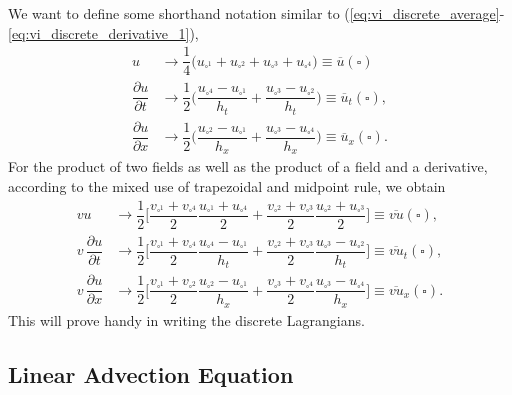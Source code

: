 \documentclass[12pt,a4paper,reqno]{article}
\begin{document}
We want to define some shorthand notation similar to (\ref{eq:vi_discrete_average}-\ref{eq:vi_discrete_derivative_1}),
\begin{align}
\label{eq:applications_definitions_discrete_average}
u &\rightarrow \dfrac{1}{4} \Big( u_{\square^1} + u_{\square^2} + u_{\square^3} + u_{\square^4} \Big) \equiv \overline{u} (\square) \\
\label{eq:applications_definitions_discrete_derivative_t}
\dfrac{\partial u}{\partial t} &\rightarrow \dfrac{1}{2} \bigg( \dfrac{u_{\square^4} - u_{\square^1}}{h_{t}} + \dfrac{u_{\square^3} - u_{\square^2}}{h_{t}} \bigg) \equiv \overline{u}_{t} (\square) , \\
\label{eq:applications_definitions_discrete_derivative_x}
\dfrac{\partial u}{\partial x} &\rightarrow \dfrac{1}{2} \bigg( \dfrac{u_{\square^2} - u_{\square^1}}{h_{x}} + \dfrac{u_{\square^3} - u_{\square^4}}{h_{x}} \bigg) \equiv \overline{u}_{x} (\square) .
\end{align}
For the product of two fields as well as the product of a field and a derivative, according to the mixed use of trapezoidal and midpoint rule, we obtain
\begingroup
\allowdisplaybreaks
\begin{align}
\label{eq:applications_definitions_discrete_average_trapezoidal}
v u &\rightarrow
\dfrac{1}{2} \bigg[
\dfrac{v_{\square^{1}} + v_{\square^{4}}}{2}
\dfrac{u_{\square^{1}} + u_{\square^{4}}}{2} +
\dfrac{v_{\square^{2}} + v_{\square^{3}}}{2}
\dfrac{u_{\square^{2}} + u_{\square^{3}}}{2}
\bigg] \equiv \overline{v u} (\square) ,
\\
\label{eq:applications_definitions_discrete_derivative_trapezoidal_t}
v \, \dfrac{\partial u}{\partial t} &\rightarrow
\dfrac{1}{2} \bigg[
\dfrac{v_{\square^{1}} + v_{\square^{4}}}{2}
\dfrac{u_{\square^{4}} - u_{\square^{1}}}{h_{t}} +
\dfrac{v_{\square^{2}} + v_{\square^{3}}}{2}
\dfrac{u_{\square^{3}} - u_{\square^{2}}}{h_{t}}
\bigg] \equiv \overline{v u}_{t} (\square) ,
\\
\label{eq:applications_definitions_discrete_derivative_trapezoidal_x}
v \, \dfrac{\partial u}{\partial x} &\rightarrow
\dfrac{1}{2} \bigg[
\dfrac{v_{\square^{1}} + v_{\square^{2}}}{2}
\dfrac{u_{\square^{2}} - u_{\square^{1}}}{h_{x}} +
\dfrac{v_{\square^{3}} + v_{\square^{4}}}{2}
\dfrac{u_{\square^{3}} - u_{\square^{4}}}{h_{x}}
\bigg] \equiv \overline{v u}_{x} (\square) 
.
\end{align}
\endgroup
This will prove handy in writing the discrete Lagrangians.

\subsection{Linear Advection Equation}
\label{sec:advection}
\end{document}
